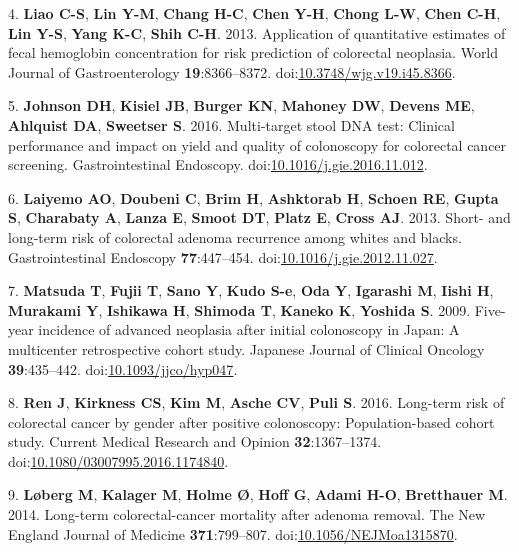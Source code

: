 \documentclass[12pt,]{article}
\begin{document}
\hypertarget{ref-liao_application_2013}{}
4. \textbf{Liao C-S}, \textbf{Lin Y-M}, \textbf{Chang H-C}, \textbf{Chen
Y-H}, \textbf{Chong L-W}, \textbf{Chen C-H}, \textbf{Lin Y-S},
\textbf{Yang K-C}, \textbf{Shih C-H}. 2013. Application of quantitative
estimates of fecal hemoglobin concentration for risk prediction of
colorectal neoplasia. World Journal of Gastroenterology
\textbf{19}:8366--8372.
doi:\href{https://doi.org/10.3748/wjg.v19.i45.8366}{10.3748/wjg.v19.i45.8366}.

\hypertarget{ref-johnson_multi-target_2016}{}
5. \textbf{Johnson DH}, \textbf{Kisiel JB}, \textbf{Burger KN},
\textbf{Mahoney DW}, \textbf{Devens ME}, \textbf{Ahlquist DA},
\textbf{Sweetser S}. 2016. Multi-target stool DNA test: Clinical
performance and impact on yield and quality of colonoscopy for
colorectal cancer screening. Gastrointestinal Endoscopy.
doi:\href{https://doi.org/10.1016/j.gie.2016.11.012}{10.1016/j.gie.2016.11.012}.

\hypertarget{ref-laiyemo_short-_2013}{}
6. \textbf{Laiyemo AO}, \textbf{Doubeni C}, \textbf{Brim H},
\textbf{Ashktorab H}, \textbf{Schoen RE}, \textbf{Gupta S},
\textbf{Charabaty A}, \textbf{Lanza E}, \textbf{Smoot DT}, \textbf{Platz
E}, \textbf{Cross AJ}. 2013. Short- and long-term risk of colorectal
adenoma recurrence among whites and blacks. Gastrointestinal Endoscopy
\textbf{77}:447--454.
doi:\href{https://doi.org/10.1016/j.gie.2012.11.027}{10.1016/j.gie.2012.11.027}.

\hypertarget{ref-matsuda_five-year_2009}{}
7. \textbf{Matsuda T}, \textbf{Fujii T}, \textbf{Sano Y}, \textbf{Kudo
S-e}, \textbf{Oda Y}, \textbf{Igarashi M}, \textbf{Iishi H},
\textbf{Murakami Y}, \textbf{Ishikawa H}, \textbf{Shimoda T},
\textbf{Kaneko K}, \textbf{Yoshida S}. 2009. Five-year incidence of
advanced neoplasia after initial colonoscopy in Japan: A multicenter
retrospective cohort study. Japanese Journal of Clinical Oncology
\textbf{39}:435--442.
doi:\href{https://doi.org/10.1093/jjco/hyp047}{10.1093/jjco/hyp047}.

\hypertarget{ref-ren_long-term_2016}{}
8. \textbf{Ren J}, \textbf{Kirkness CS}, \textbf{Kim M}, \textbf{Asche
CV}, \textbf{Puli S}. 2016. Long-term risk of colorectal cancer by
gender after positive colonoscopy: Population-based cohort study.
Current Medical Research and Opinion \textbf{32}:1367--1374.
doi:\href{https://doi.org/10.1080/03007995.2016.1174840}{10.1080/03007995.2016.1174840}.

\hypertarget{ref-loberg_long-term_2014}{}
9. \textbf{Løberg M}, \textbf{Kalager M}, \textbf{Holme Ø}, \textbf{Hoff
G}, \textbf{Adami H-O}, \textbf{Bretthauer M}. 2014. Long-term
colorectal-cancer mortality after adenoma removal. The New England
Journal of Medicine \textbf{371}:799--807.
doi:\href{https://doi.org/10.1056/NEJMoa1315870}{10.1056/NEJMoa1315870}.
\end{document}
